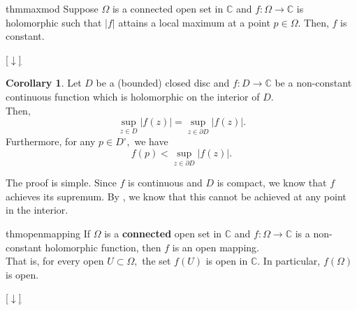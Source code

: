 \documentclass[12pt,oneside]{book}
\theoremstyle{definition}
\numberwithin{thm}{chapter}
\newtheorem{cor}[thm]{Corollary}
\newcommand{\downsym}{[$\downarrow$]}
\begin{document}
\begin{restatable}{thm}{maxmod}
\label{thm:maxmod}
	Suppose $\Omega$ is a connected open set in $\mathbb{C}$ and $f:\Omega \to \mathbb{C}$ is holomorphic such that $\left|f\right|$ attains a local maximum at a point $p \in \Omega.$ Then, $f$ is constant.
\end{restatable}
\begin{flushright}\hyperref[thm:maxmod2]{\downsym}\end{flushright}

\begin{cor} \label{cor:modinterior}
	Let $D$ be a (bounded) closed disc and $f:D\to \mathbb{C}$ be a non-constant continuous function which is holomorphic on the interior of $D.$\\
	Then, 
	\begin{equation*} 
		\sup_{z \in D}\left|f(z)\right| = \sup_{z \in \partial D}\left|f(z)\right|.
	\end{equation*}
	Furthermore, for any $p \in D^\circ,$ we have
	\begin{equation*} 
		f(p) < \sup_{z \in \partial D}\left|f(z)\right|.	
	\end{equation*}
\end{cor}
The proof is simple. Since $f$ is continuous and $D$ is compact, we know that $f$ achieves its supremum. By , we know that this cannot be achieved at any point in the interior.

\begin{restatable}{thm}{openmapping}
\label{thm:openmapping}
	If $\Omega$ is a \textbf{connected} open set in $\mathbb{C}$ and $f:\Omega \to \mathbb{C}$ is a non-constant holomorphic function, then $f$ is an open mapping.\\
	That is, for every open $U \subset \Omega,$ the set $f(U)$ is open in $\mathbb{C}.$ In particular, $f(\Omega)$ is open.
\end{restatable}
\begin{flushright}\hyperref[thm:openmapping2]{\downsym}\end{flushright}


\end{document}
